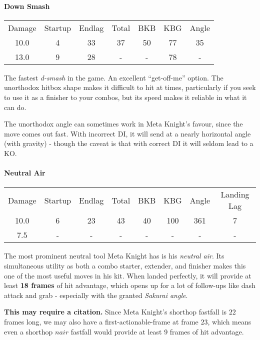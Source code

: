 \paragraph{Down Smash}
\begin{center}
	\begin{tabular}{| c | c  c  c | c  c  c |}
		\hline
		Damage 	&	Startup	& Endlag & Total & BKB 	& 	KBG & Angle		\\
		10.0		&	4		&	33	 &	37	&	50	&	77 & 	35\deg 	\\
		13.0		&	9		&	28	 &	-	&	- 	& 	78 	&	-		\\
		\hline
	\end{tabular}
\end{center}
The fastest \textit{d-smash} in the game. An excellent ``get-off-me'' option. The unorthodox hitbox shape makes it difficult to hit at times, particularly if you seek to use it as a finisher to your combos, but its speed makes it reliable in what it can do.

The unorthodox angle can sometimes work in Meta Knight's favour, since the move comes out fast. With incorrect DI, it will send at a nearly horizontal angle (with gravity) - though the caveat is that with correct DI it will seldom lead to a KO.

\paragraph{Neutral Air}
\begin{center}
	\begin{tabular}{| c | c  c  c | c  c  c | c |}
		\hline
		Damage &	Startup	& Endlag & Total & BKB & KBG & Angle &	Landing Lag	\\
		10.0	&	6	&	23	&	43	&	40	&	100 & 	361\deg	&	7 		\\
		7.5	&	-	&	-	&	-	&	- 	& 	- 	&	-		&	-		\\
		\hline
	\end{tabular}
\end{center}
The most prominent neutral tool Meta Knight has is his \textit{neutral air}. Its simultaneous utility as both a combo starter, extender, and finisher makes this one of the most useful moves in his kit. When landed perfectly, it will provide at least \textbf{18 frames} of hit advantage, which opens up for a lot of follow-ups like dash attack and grab - especially with the granted \textit{Sakurai angle}. 

\textbf{This may require a citation.} Since Meta Knight's shorthop fastfall is $22$ frames long, we may also have a first-actionable-frame at frame $23$, which means even a shorthop $nair$ fastfall would provide at least 9 frames of hit advantage.
